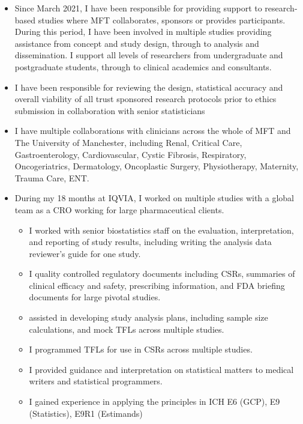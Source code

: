 \documentclass[
]{article}
\providecommand{\tightlist}{%
  \setlength{\itemsep}{0pt}\setlength{\parskip}{0pt}}
\begin{document}
\begin{itemize}
\tightlist
\item
  Since March 2021, I have been responsible for providing support to
  research-based studies where MFT collaborates, sponsors or provides
  participants. During this period, I have been involved in multiple
  studies providing assistance from concept and study design, through to
  analysis and dissemination. I support all levels of researchers from
  undergraduate and postgraduate students, through to clinical academics
  and consultants.
\item
  I have been responsible for reviewing the design, statistical accuracy
  and overall viability of all trust sponsored research protocols prior
  to ethics submission in collaboration with senior statisticians
\item
  I have multiple collaborations with clinicians across the whole of MFT
  and The University of Manchester, including Renal, Critical Care,
  Gastroenterology, Cardiovascular, Cystic Fibrosis, Respiratory,
  Oncogeriatrics, Dermatology, Oncoplastic Surgery, Physiotherapy,
  Maternity, Trauma Care, ENT.
\item
  During my 18 months at IQVIA, I worked on multiple studies with a
  global team as a CRO working for large pharmaceutical clients.

  \begin{itemize}
  \tightlist
  \item
    I worked with senior biostatistics staff on the evaluation,
    interpretation, and reporting of study results, including writing
    the analysis data reviewer's guide for one study.
  \item
    I quality controlled regulatory documents including CSRs, summaries
    of clinical efficacy and safety, prescribing information, and FDA
    briefing documents for large pivotal studies.
  \item
    assisted in developing study analysis plans, including sample size
    calculations, and mock TFLs across multiple studies.
  \item
    I programmed TFLs for use in CSRs across multiple studies.
  \item
    I provided guidance and interpretation on statistical matters to
    medical writers and statistical programmers.
  \item
    I gained experience in applying the principles in ICH E6 (GCP), E9
    (Statistics), E9R1 (Estimands)
  \end{itemize}
\end{itemize}
\end{document}
